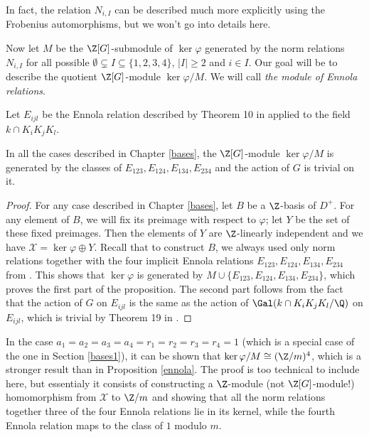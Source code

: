 \begin{rem}
In fact, the relation $N_{i,I}$ can be described much more explicitly using the Frobenius automorphisms, but we won't go into details here.
\end{rem}

Now let $M$ be the $\Z[G]$-submodule of $\ker \varphi$ generated by the norm relations $N_{i,I}$ for all possible $\emptyset\subsetneq I \subseteq \{1,2,3,4\}$, $|I|\geq 2$ and $i\in I$. Our goal will be to describe the quotient $\Z[G]$-module $\ker\varphi/M$. We will call \textit{the module of Ennola relations}. %

Let $E_{ijl}$ be the Ennola relation described by Theorem 10 in \citep{Kucera2016} applied to the field $k\cap K_iK_jK_l$.
\begin{prop}\label{ennola}
In all the cases described in Chapter \ref{bases}, the $\Z[G]$-module $\ker\varphi/M$ is generated by the classes of $E_{123},E_{124},E_{134},E_{234}$ and the action of $G$ is trivial on it.
\end{prop}

\begin{proof}
For any case described in Chapter \ref{bases}, let $B$ be a $\Z$-basis of $D^+$. For any element of $B$, we will fix its preimage with respect to $\varphi$; let $Y$ be the set of these fixed preimages. Then the elements of $Y$ are $\Z$-linearly independent and we have $\mathcal{X}=\ker\varphi\oplus Y$. Recall that to construct $B$, we always used only norm relations together with the four implicit Ennola relations $E_{123},E_{124},E_{134},E_{234}$ from \citep{Kucera2016}. This shows that $\ker \varphi$ is generated by $M\cup\{E_{123},E_{124},E_{134},E_{234}\}$, which proves the first part of the proposition. The second part follows from the fact that the action of $G$ on $E_{ijl}$ is the same as the action of $\Gal(k\cap K_iK_jK_l/\Q)$ on $E_{ijl}$, which is trivial by Theorem 19 in \citep{Kucera2016}.
\end{proof}

\begin{rem}
In the case $a_1=a_2=a_3=a_4=r_1=r_2=r_3=r_4=1$ (which is a special case of the one in Section \ref{bases1}), it can be shown that $\ker \varphi/M \cong (\Z/m)^4$, which is a stronger result than in Proposition \ref{ennola}. The proof is too technical to include here, but essentialy it consists of constructing a $\Z$-module (not $\Z[G]$-module!) homomorphism from $\mathcal{X}$ to $\Z/m$ and showing that all the norm relations together three of the four Ennola relations lie in its kernel, while the fourth Ennola relation maps to the class of $1$ modulo $m$.
\end{rem}

